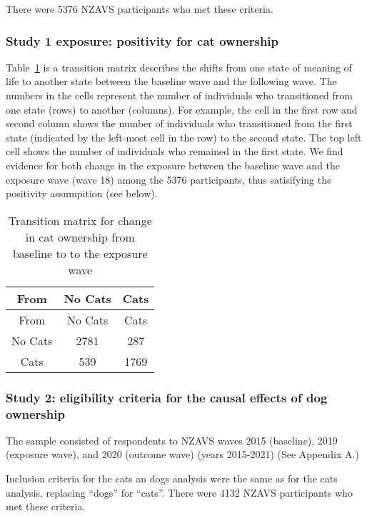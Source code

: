 \documentclass[
  singlecolumn,
  9pt]{article}
\begin{document}
There were 5376 NZAVS participants who met these criteria.

\subsubsection{Study 1 exposure: positivity for cat
ownership}\label{study-1-exposure-positivity-for-cat-ownership}

Table~\ref{tbl-transition} is a transition matrix describes the shifts
from one state of meaning of life to another state between the baseline
wave and the following wave. The numbers in the cells represent the
number of individuals who transitioned from one state (rows) to another
(columns). For example, the cell in the first row and second column
shows the number of individuals who transitioned from the first state
(indicated by the left-most cell in the row) to the second state. The
top left cell shows the number of individuals who remained in the first
state. We find evidence for both change in the exposure between the
baseline wave and the exposure wave (wave 18) among the 5376
participants, thus satisifying the positivity assumpition (see below).

\begin{longtable}[]{@{}ccc@{}}
\caption{Transition matrix for change in cat ownership from baseline to
to the exposure wave}\label{tbl-transition}\tabularnewline
\toprule\noalign{}
From & No Cats & Cats \\
\midrule\noalign{}
\endfirsthead
\toprule\noalign{}
From & No Cats & Cats \\
\midrule\noalign{}
\endhead
\bottomrule\noalign{}
\endlastfoot
No Cats & 2781 & 287 \\
Cats & 539 & 1769 \\
\end{longtable}

\subsubsection{Study 2: eligibility criteria for the causal effects of
dog
ownership}\label{study-2-eligibility-criteria-for-the-causal-effects-of-dog-ownership}

The sample consisted of respondents to NZAVS waves 2015 (baseline), 2019
(exposure wave), and 2020 (outcome wave) (years 2015-2021) (See Appendix
A.)

Inclusion criteria for the cats an dogs analysis were the same as for
the cats analysis, replacing ``dogs'' for ``cats''. There were 4132
NZAVS participants who met these criteria.
\end{document}
